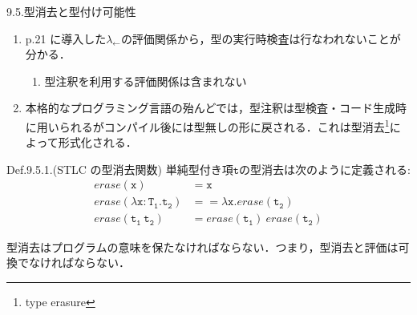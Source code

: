 \documentclass[9pt]{beamer}
\begin{document}
\begin{frame}{9.5.型消去と型付け可能性}
\begin{enumerate}
\item p.21 に導入した$\lambda_{\leftarrow}$の評価関係から，型の実行時検査は行なわれないことが分かる．\begin{enumerate}\item 型注釈を利用する評価関係は含まれない\end{enumerate}
\item 本格的なプログラミング言語の殆んどでは，型注釈は型検査・コード生成時に用いられるがコンパイル後には型無しの形に戻される．これは型消去\footnote{type erasure}によって形式化される．
\end{enumerate}
\begin{alertblock}{Def.9.5.1.(STLC の型消去関数)}
単純型付き項$\mathtt{t}$の型消去は次のように定義される:\begin{align*}
erase(\mathtt{x}) &= \mathtt{x}\\
erase(\mathtt{\lambda x:T_{1}.t_{2}}) &= = \lambda \mathtt{x}.erase(\mathtt{t_{2}})\\
erase(\mathtt{t_{1}\ t_{2}}) &= erase(\mathtt{t_{1}})\ erase(\mathtt{t_{2}})
\end{align*}
\end{alertblock}
型消去はプログラムの意味を保たなければならない．つまり，型消去と評価は可換でなければならない．
\end{frame}
\end{document}
